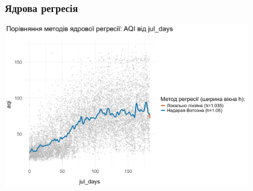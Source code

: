 ﻿\documentclass{beamer}
\begin{document}
%  
% 

\begin{frame}
  \frametitle{Ядрова регресія}
  
  \begin{center}
    \includegraphics[height=2.8in]{plots/lab4/kernal/npreg_comparison_final_10.png}
  \end{center}
 
\end{frame}
\end{document}
